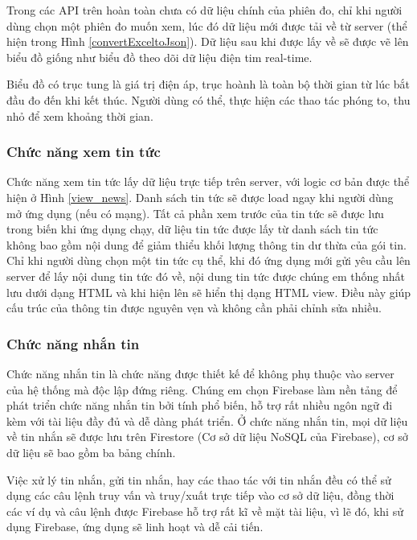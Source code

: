 Trong các API trên hoàn toàn chưa có dữ liệu chính của phiên đo, chỉ khi người dùng chọn một phiên đo muốn xem, lúc đó dữ liệu
mới được tải về từ server (thể hiện trong Hình \ref{convertExceltoJson}). Dữ liệu sau khi được lấy về sẽ được vẽ lên biểu đồ giống
như biểu đồ theo dõi dữ liệu điện tim real-time.

Biểu đồ có trục tung là giá trị điện áp, trục hoành là toàn bộ thời gian từ lúc bắt đầu đo đến khi kết thúc. Người dùng có thể,
thực hiện các thao tác phóng to, thu nhỏ để xem khoảng thời gian.

\subsubsection{Chức năng xem tin tức}

Chức năng xem tin tức lấy dữ liệu trực tiếp trên server, với logic cơ bản được thể hiện ở Hình \ref{view_news}. 
Danh sách tin tức sẽ được load ngay khi người dùng mở ứng dụng (nếu có mạng). Tất cả phần xem trước của tin tức sẽ được lưu
trong biến khi ứng dụng chạy, dữ liệu tin tức được lấy từ danh sách tin tức không bao gồm nội dung để giảm thiểu khối lượng
thông tin dư thừa của gói tin. Chỉ khi người dùng chọn một tin tức cụ thể, khi đó ứng dụng mới gửi yêu cầu lên server để lấy
nội dung tin tức đó về, nội dung tin tức được chúng em thống nhất lưu dưới dạng HTML và khi hiện lên sẽ hiển thị dạng HTML view.
Điều này giúp cấu trúc của thông tin được nguyên vẹn và không cần phải chỉnh sửa nhiều.

\subsubsection{Chức năng nhắn tin}

Chức năng nhắn tin là chức năng được thiết kế để không phụ thuộc vào server của hệ thống mà độc lập đứng riêng. Chúng em
chọn Firebase làm nền tảng để phát triển chức năng nhắn tin bởi tính phổ biến, hỗ trợ rất nhiều ngôn ngữ đi kèm với tài liệu đầy đủ 
và dễ dàng phát triển.
Ở chức năng nhắn tin, mọi dữ liệu về tin nhắn sẽ được lưu trên Firestore (Cơ sở dữ liệu NoSQL của Firebase), cơ sở dữ liệu sẽ
bao gồm ba bảng chính. 

Việc xử lý tin nhắn, gửi tin nhắn, hay các thao tác với tin nhắn đều có thể sử dụng các câu lệnh truy vấn và truy/xuất
trực tiếp vào cơ sở dữ liệu, đồng thời các ví dụ và câu lệnh được Firebase hỗ trợ rất kĩ về mặt tài liệu, vì lẽ đó, khi sử dụng
Firebase, ứng dụng sẽ linh hoạt và dễ cải tiến.

